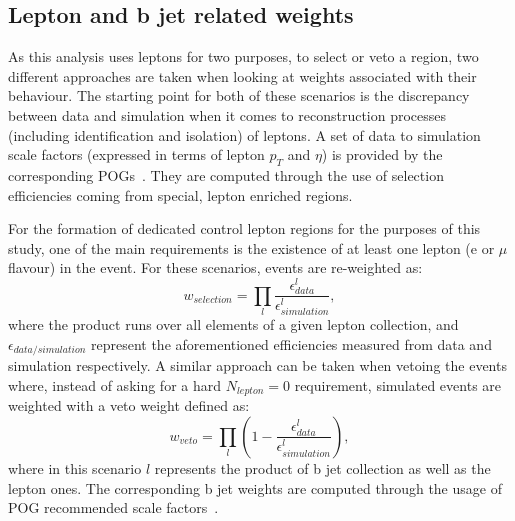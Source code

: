 \subsection{Lepton and b jet related weights}
\hspace{10pt} As this analysis uses leptons for two purposes, to select or veto a region, two different approaches are taken when looking at weights associated with their behaviour. The starting point for both of these scenarios is the discrepancy between data and simulation when it comes to reconstruction processes (including identification and isolation) of leptons. A set of data to simulation scale factors (expressed in terms of lepton $p_T$ and $\eta$) is provided by the corresponding POGs~\cite{twiki_electron_sfs, twiki_muon_sfs, twiki_tau_pog}. They are computed through the use of selection efficiencies coming from special, lepton enriched regions. 

\hspace{10pt} For the formation of dedicated control lepton regions for the purposes of this study, one of the main requirements is the existence of at least one lepton (e or $\mu$ flavour) in the event. For these scenarios, events are re-weighted as:
\begin{equation}
    w_{selection} = \prod_l \frac{\epsilon^{l}_{data}}{\epsilon^{l}_{simulation}},
\end{equation}
where the product runs over all elements of a given lepton collection, and $\epsilon_{data/simulation}$ represent the aforementioned efficiencies measured from data and simulation respectively. A similar approach can be taken when vetoing the events where, instead of asking for a hard $N_{lepton}=0$ requirement, simulated events are weighted with a veto weight defined as:
\begin{equation}
    w_{veto} = \prod_l \left (1-\frac{\epsilon^{l}_{data}}{\epsilon^{l}_{simulation}}\right),
\end{equation}
where in this scenario $l$ represents the product of b jet collection as well as the lepton ones. The corresponding b jet weights are computed through the usage of POG recommended scale factors~\cite{twiki_bjets_methods}.


